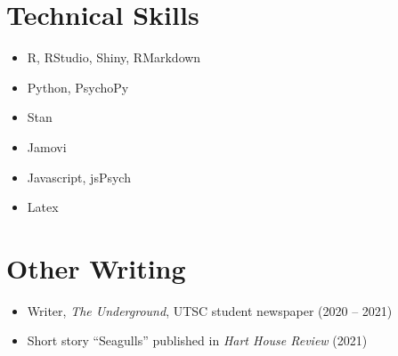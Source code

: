 \documentclass[12pt, letterpaper]{article}
\begin{document}
\section{Technical Skills}
\begin{center}
\begin{itemize}
  \item R, RStudio, Shiny, RMarkdown
  \item Python, PsychoPy
  \item Stan
  \item Jamovi
  \item Javascript, jsPsych
  \item Latex
\end{itemize}
\end{center}

\section{Other Writing}
\begin{itemize}
  \item Writer, \textit{The Underground}, UTSC student newspaper (2020 -- 2021)
  \item Short story “Seagulls” published in \textit{Hart House Review} (2021)
\end{itemize}
\end{document}
